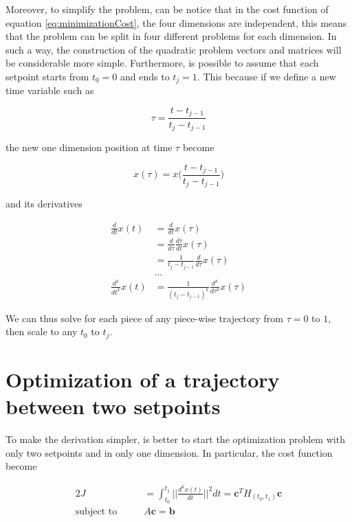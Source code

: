 \noindent Moreover, to simplify the problem, can be notice that in the cost function of equation \eqref{eq:minimizationCost}, the four dimensions are independent, this means that the problem can be split in four different problems for each dimension. In such a way, the construction of the quadratic problem vectors and matrices will be considerable more simple. Furthermore, is possible to assume that each setpoint starts from $t_0=0$ and ends to $t_j=1$. This because if we define a new time variable such as

\begin{equation}
	\tau = \frac{t-t_{j-1}}{t_j-t_{j-1}}
	\label{eq:simplyTime}
\end{equation}

\noindent the new one dimension position at time $\tau$ become

\begin{equation}
	x(\tau) = x\Big(\frac{t-t_{j-1}}{t_j-t_{j-1}}\Big)	
\end{equation}

\noindent and its derivatives

\begin{align*}
	\frac{d}{dt}x(t) &= \frac{d}{dt}x(\tau) \\
	&= \frac{d}{d\tau}\frac{d\tau}{dt}x(\tau) \\
	&= \frac{1}{t_j-t_{j-1}}\frac{d}{d\tau}x(\tau) \\
	&... \\
	\frac{d^k}{dt^k}x(t) &= \frac{1}{(t_j-t_{j-1})^k}\frac{d^k}{d\tau^k}x(\tau)
\end{align*}

\noindent We can thus solve for each piece of any piece-wise trajectory from $\tau=0$ to $1$, then scale to any $t_0$ to $t_j$.


\section{Optimization of a trajectory between two setpoints}

To make the derivation simpler, is better to start the optimization problem with only two setpoints and in only one dimension. In particular, the cost function become 

\begin{alignat}{2}
	J &= \int_{t_0}^{t_1}\Bigg|\Bigg|\frac{d^kx(t)}{dt}\Bigg|\Bigg|^2dt = \mathbf{c}^TH_{(t_0,t_1)}\mathbf{c} \\
	\text{subject to}\qquad & A\mathbf{c} = \mathbf{b} \nonumber
	\label{eq:oneSetpoint}
\end{alignat}

